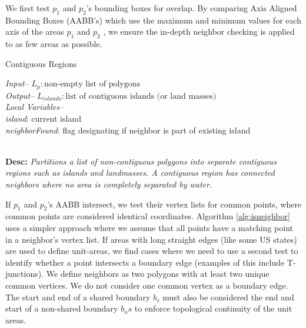 We first test $p_1$ and $p_2$'s bounding boxes for overlap. By comparing Axis Aligned Bounding Boxes (AABB's) which use the maximum and minimum values for each axis of the areas $p_1$ and $p_2$ \cite{ericson2004real}, we ensure the in-depth neighbor checking is applied to as few areas as possible.
  
\begin{algorithm}[h]
\footnotesize
\caption{Contiguous Regions}
\emph{Input--} $L_{p}: \text{non-empty list of polygons}$\\
\emph{Output--} $L_{islands}: \text{list of contiguous islands (or land masses)}$\\
\emph{Local Variables--}\\
\textit{island}: current island\\
\textit{neighborFound}: flag designating if neighbor is part of existing island

\begin{algorithmic}[1] 
\IfEnd
{}
\IfEnd
{}
\WhileEnd
{}
\EndProcedure
\end{algorithmic} \label{alg:contiguous}

~\\
\textbf{Desc: }\emph{Partitions a list of non-contiguous polygons into separate contiguous regions such as islands and landmasses. A contiguous region has connected neighbors where no area is completely separated by water. }
\end{algorithm}


If $p_1$ and $p_2$'s AABB intersect, we test their vertex lists for common points, where common points are considered identical coordinates. Algorithm \ref{alg:isneighbor} uses a simpler approach where we assume that all points have a matching point in a neighbor's vertex list. If areas with long straight edges (like some US states) are used to define unit-areas, we find cases where we need to use a second test to identify whether a point intersects a boundary edge (examples of this include T-junctions). We define neighbors as two polygons with at least two unique common vertices. We do not consider one common vertex as a boundary edge. The start and end of a shared boundary $b_s$ must also be considered the end and start of a non-shared boundary $b_ns$ to enforce topological continuity of the unit areas. 

